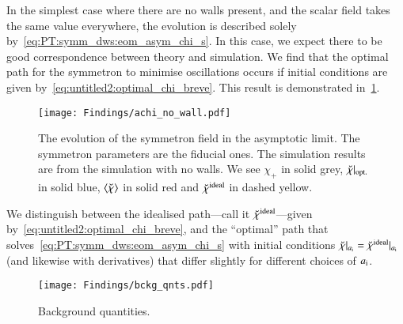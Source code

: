 

\newcommand{\brchi}{\breve{\chi}}




In the simplest case where there are no walls present, and the scalar field takes the same value everywhere, the evolution is described solely by~\cref{eq:PT:symm_dws:eom_asym_chi_s}. In this case, we expect there to be good correspondence between theory and simulation. We find that the optimal path for the symmetron to minimise oscillations occurs if initial conditions are given by~\cref{eq:untitled2:optimal_chi_breve}. This result is demonstrated in~\cref{fig:results:achi:achi_no_wall}. 
\begin{figure}[h]
    \centering
    \texttt{[image: Findings/achi\_no\_wall.pdf]}
    \caption{The evolution of the symmetron field in the asymptotic limit. The symmetron parameters are the fiducial ones. The simulation results are from the simulation with no walls. We see $\chi_+$ in solid grey, $\brchi\rvert\ped{opt.}$ in solid blue, $\avg{\brchi}$ in solid red and $\brchi\ap{ideal}$ in dashed yellow.}
    \label{fig:results:achi:achi_no_wall}
\end{figure}
We distinguish between the idealised path---call it $\brchi\ap{ideal}$---given by~\cref{eq:untitled2:optimal_chi_breve}, and the ``optimal'' path that solves~\cref{eq:PT:symm_dws:eom_asym_chi_s} with initial conditions $\brchi\rvert_{a\ped{i}} = \brchi\ap{ideal}\rvert_{a\ped{i}}$ (and likewise with derivatives) that differ slightly for different choices of $a_\mathrm{i}$. 

\begin{figure}[h!]
    \centering
    \texttt{[image: Findings/bckg\_qnts.pdf]}
    \caption{Background quantities. }
    \label{fig:results:achi:bckg_qnts}
\end{figure}

